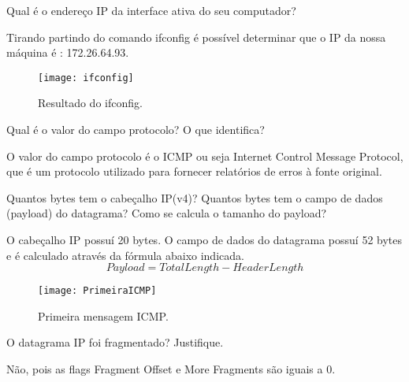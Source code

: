 \documentclass{exam}
\begin{document}
\begin{questions}

\question  Qual é o endereço IP da interface ativa do seu computador? 
\begin{solution}[.2in]
Tirando partindo do comando ifconfig é possível determinar que o IP da nossa máquina é : 
172.26.64.93.
\begin{figure}[H]
\centering\texttt{[image: ifconfig]} 
\caption{\label{fig:controller}Resultado do ifconfig.}
\end{figure} 
\end{solution}

\question Qual é o valor do campo protocolo? O que identifica?
\begin{solution}[.2in]
O valor do campo protocolo é o ICMP ou seja Internet Control Message Protocol, que é um protocolo utilizado para fornecer 
relatórios de erros à fonte original.
\end{solution}

\question Quantos bytes tem o cabe\c{c}alho IP(v4)? 
Quantos bytes tem o campo de dados (payload) do datagrama? Como se calcula o tamanho do payload?
\begin{solution}[.2in]
O cabeçalho IP possuí 20 bytes.
O campo de dados do datagrama possuí 52 bytes e é calculado através da fórmula abaixo indicada.
\begin{equation}
Payload=Total Length - Header Length
\end{equation}
\begin{figure}[H]
\centering\texttt{[image: PrimeiraICMP]} 
\caption{\label{fig:controller}Primeira mensagem ICMP.}
\end{figure} 
\end{solution}

\question O datagrama IP foi fragmentado? Justifique.
\begin{solutionorlines}[2in]
Não, pois as flags Fragment Offset e More Fragments são iguais a 0.
\end{solutionorlines}


\end{questions}
\end{document}

